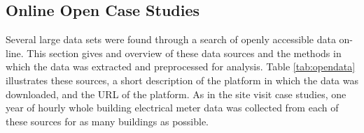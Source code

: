 \subsection{Online Open Case Studies}
\label{openonlinecasestudies}

Several large data sets were found through a search of openly accessible data on-line. This section gives and overview of these data sources and the methods in which the data was extracted and preprocessed for analysis. Table \ref{tab:opendata} illustrates these sources, a short description of the platform in which the data was downloaded, and the URL of the platform. As in the site visit case studies, one year of hourly whole building electrical meter data was collected from each of these sources for as many buildings as possible.

